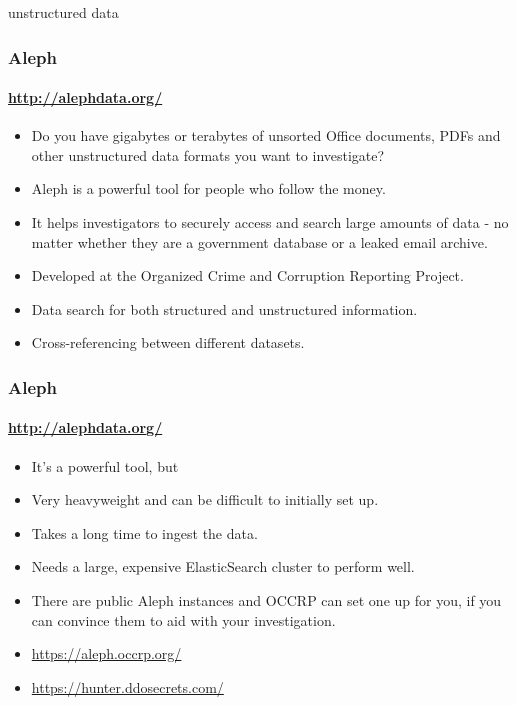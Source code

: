 \documentclass[aspectratio=169,usenames,dvipsnames]{beamer}
\begin{document}
\begin{frame}[c]

  \LARGE
  \centering
  unstructured data

\end{frame}
\begin{frame}
  \frametitle{Aleph}
  \framesubtitle{\url{http://alephdata.org/}}

  \begin{itemize}[<+->]
    \item Do you have gigabytes or terabytes of unsorted Office documents,
      PDFs and other unstructured data formats you want to investigate?
    \item Aleph is a powerful tool for people who follow the money.
    \item It helps investigators to securely access and search large amounts
      of data - no matter whether they are a government database or a leaked
      email archive.
    \item Developed at the Organized Crime and Corruption Reporting Project.
    \item Data search for both structured and unstructured information.
    \item Cross-referencing between different datasets.
  \end{itemize}

\end{frame}

\begin{frame}
  \frametitle{Aleph}
  \framesubtitle{\url{http://alephdata.org/}}

  \begin{itemize}[<+->]
    \item It's a powerful tool, but
    \item Very heavyweight and can be difficult to initially set up.
    \item Takes a long time to ingest the data.
    \item Needs a large, expensive ElasticSearch cluster to perform well.
    \item There are public Aleph instances and OCCRP can set one up for you,
      if you can convince them to aid with your investigation.
    \item \url{https://aleph.occrp.org/}
    \item \url{https://hunter.ddosecrets.com/}
  \end{itemize}

\end{frame}
\end{document}
